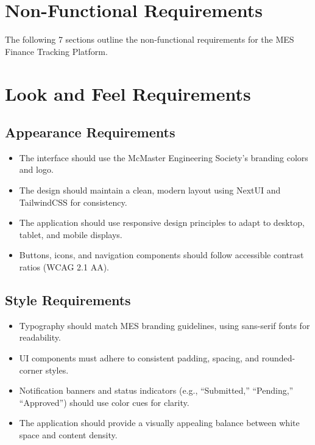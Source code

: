 \documentclass[12pt]{article}
\begin{document}
\section{Non-Functional Requirements}

The following 7 sections outline the non-functional requirements for the MES Finance Tracking Platform.

\section{Look and Feel Requirements}
    \subsection{Appearance Requirements}
    \begin{itemize}
        \item The interface should use the McMaster Engineering Society's branding colors and logo.
        \item The design should maintain a clean, modern layout using NextUI and TailwindCSS for consistency.
        \item The application should use responsive design principles to adapt to desktop, tablet, and mobile displays.
        \item Buttons, icons, and navigation components should follow accessible contrast ratios (WCAG 2.1 AA).
    \end{itemize}

    \subsection{Style Requirements}
    \begin{itemize}
        \item Typography should match MES branding guidelines, using sans-serif fonts for readability.
        \item UI components must adhere to consistent padding, spacing, and rounded-corner styles.
        \item Notification banners and status indicators (e.g., “Submitted,” “Pending,” “Approved”) should use color cues for clarity.
        \item The application should provide a visually appealing balance between white space and content density.
    \end{itemize}
\end{document}
